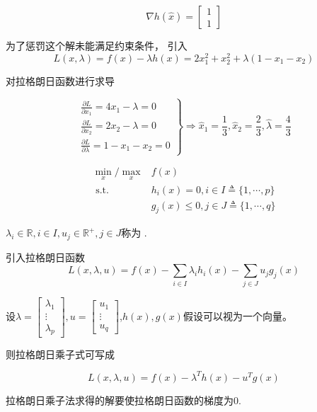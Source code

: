 $$ \nabla h(\hat{x})=\left[\begin{array}{l}1 \\ 1\end{array}\right] $$

为了惩罚这个解未能满足约束条件， 引入
\begin{equation}
L(x, \lambda)=f(x)-\lambda h(x)=2 x_{1}^{2}+x_{2}^{2}+\lambda\left(1-x_{1}-x_{2}\right)
\end{equation}

对拉格朗日函数进行求导

\begin{equation} \left.\begin{array}{l}\frac{\partial L}{\partial x_{1}}=4 x_{1}-\lambda=0 \\ \frac{\partial L}{\partial x_{2}}=2 x_{2}-\lambda=0 \\ \frac{\partial L}{\partial \lambda}=1-x_{1}-x_{2}=0\end{array}\right \} \Rightarrow \hat{x}_{1}=\frac{1}{3}, \hat{x}_{2}=\frac{2}{3}, \hat{\lambda}=\frac{4}{3} \end{equation}

\begin{definition}
    \begin{equation}\begin{aligned}
        \min _{x} / \max_{x}& f(x) \\
\text{ s.t. } & h_{i}(x)=0, i \in I \triangleq\{1, \cdots, p\} \\
&g_{j}(x) \leq 0, j \in J \triangleq\{1, \cdots, q\}
    \end{aligned}\end{equation}

$ \lambda_{i} \in \mathbb{R}, i \in {I}, u_{j} \in \mathbb{R}^{+}, j \in J $称为 .

引入拉格朗日函数 \begin{equation} L(x, \lambda, u)=f(x)-\sum_{i \in I} \lambda_{i} h_{i}(x)-\sum_{j \in J} u_{j} g_{j}(x)   \end{equation}

设$\lambda=\left[\begin{array}{c}\lambda_{1} \\ \vdots \\ \lambda_{p}\end{array}\right], u=\left[\begin{array}{c}u_{1} \\ \vdots \\ u_{q}\end{array}\right]$,$h(x),g(x)$假设可以视为一个向量。

则拉格朗日乘子式可写成


\begin{equation} L(x, \lambda, u)=f(x) - \lambda^T h(x) - u^T g(x)\end{equation}

拉格朗日乘子法求得的解要使拉格朗日函数的梯度为0.

\end{definition}


